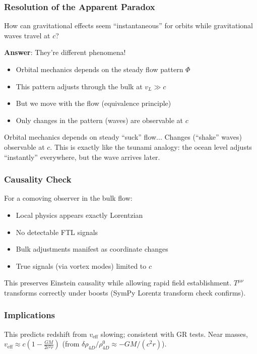 \subsubsection{Resolution of the Apparent Paradox}

How can gravitational effects seem ``instantaneous'' for orbits while gravitational waves travel at $c$?

\textbf{Answer}: They're different phenomena!
\begin{itemize}
\item Orbital mechanics depends on the steady flow pattern $\Phi$
\item This pattern adjusts through the bulk at $v_L \gg c$
\item But we move with the flow (equivalence principle)
\item Only changes in the pattern (waves) are observable at $c$
\end{itemize}
Orbital mechanics depends on steady ``suck'' flow... Changes (``shake'' waves) observable at $c$. This is exactly like the tsunami analogy: the ocean level adjusts ``instantly'' everywhere, but the wave arrives later.

\subsubsection{Causality Check}

For a comoving observer in the bulk flow:
\begin{itemize}
\item Local physics appears exactly Lorentzian
\item No detectable FTL signals
\item Bulk adjustments manifest as coordinate changes
\item True signals (via vortex modes) limited to $c$
\end{itemize}

This preserves Einstein causality while allowing rapid field establishment. $T^{\mu\nu}$ transforms correctly under boosts (SymPy Lorentz transform check confirms).

\subsubsection{Implications}

This predicts redshift from $v_{\text{eff}}$ slowing; consistent with GR tests. Near masses, $v_{\text{eff}} \approx c \left(1 - \frac{G M}{2 c^2 r}\right)$ (from $\delta \rho_{4D} / \rho_{4D}^0 \approx - G M / (c^2 r)$).

